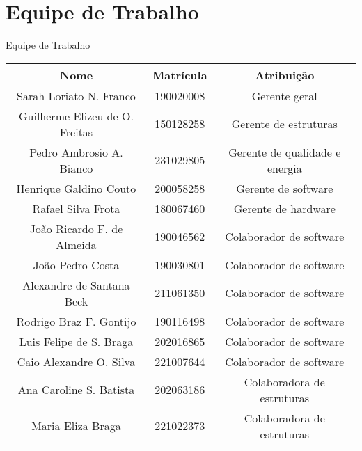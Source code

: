 \chapter{Equipe de Trabalho}

\begin{quadro}[htb]
  \caption{\label{quadro_equipe_trabalho}Equipe de Trabalho}

  \begin{tabular}{|c|c|c|}
    \hline
    \textbf{Nome} & \textbf{Matrícula} & \textbf{Atribuição} \\
    \hline
    Sarah Loriato N. Franco & 190020008 & Gerente geral \\
    \hline
    Guilherme Elizeu de O. Freitas & 150128258 & Gerente de estruturas \\
    \hline
    Pedro Ambrosio A. Bianco & 231029805 & Gerente de qualidade e energia \\
    \hline
    Henrique Galdino Couto & 200058258 & Gerente de software \\
    \hline
    Rafael Silva Frota & 180067460 & Gerente de hardware \\
    \hline
    João Ricardo F. de Almeida & 190046562 & Colaborador de software \\
    \hline
    João Pedro Costa & 190030801 & Colaborador de software \\
    \hline
    Alexandre de Santana Beck & 211061350 & Colaborador de software \\
    \hline
    Rodrigo Braz F. Gontijo & 190116498 & Colaborador de software \\
    \hline
    Luis Felipe de S. Braga & 202016865 & Colaborador de software \\
    \hline
    Caio Alexandre O. Silva & 221007644 & Colaborador de software \\
    \hline
    Ana Caroline S. Batista & 202063186 & Colaboradora de estruturas \\
    \hline
    Maria Eliza Braga & 221022373 & Colaboradora de estruturas \\
    \hline
  \end{tabular}

\end{quadro}
